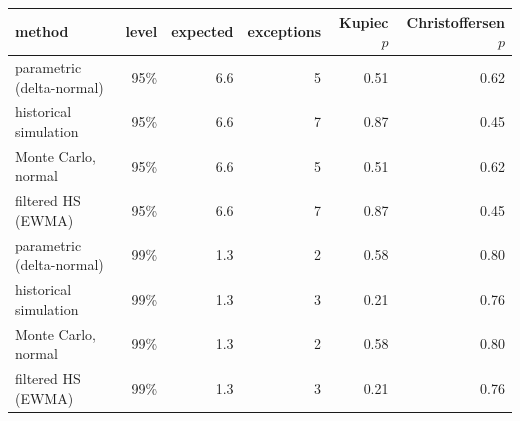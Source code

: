 \begin{tabular}{lrrrrr}
\toprule
method & level & expected & exceptions & Kupiec $p$ & Christoffersen $p$ \\
\midrule
parametric (delta-normal) & 95\% & 6.6 & 5 & 0.51 & 0.62 \\
historical simulation & 95\% & 6.6 & 7 & 0.87 & 0.45 \\
Monte Carlo, normal & 95\% & 6.6 & 5 & 0.51 & 0.62 \\
filtered HS (EWMA) & 95\% & 6.6 & 7 & 0.87 & 0.45 \\
parametric (delta-normal) & 99\% & 1.3 & 2 & 0.58 & 0.80 \\
historical simulation & 99\% & 1.3 & 3 & 0.21 & 0.76 \\
Monte Carlo, normal & 99\% & 1.3 & 2 & 0.58 & 0.80 \\
filtered HS (EWMA) & 99\% & 1.3 & 3 & 0.21 & 0.76 \\
\bottomrule
\end{tabular}
